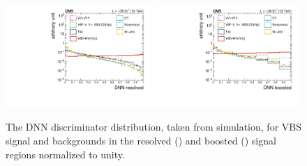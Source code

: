\begin{figure}[!htb]
  \centering
  \includegraphics[width=0.49\textwidth]{Images/VBS_Studies/Figure_003-a.pdf}
  \includegraphics[width=0.49\textwidth]{Images/VBS_Studies/Figure_003-b.pdf}
  \caption{
    The DNN discriminator distribution, taken from simulation, for VBS signal and backgrounds in the resolved (\cmsLeft)
    and boosted (\cmsRight) signal regions normalized to unity.  } \label{fig:norm:dnnbin}
\end{figure}


